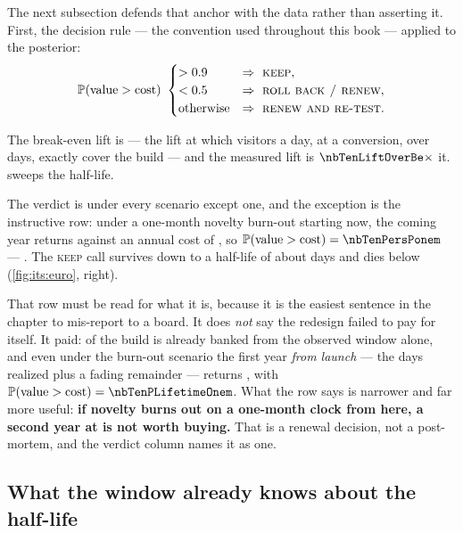 The next subsection defends that anchor with the data rather than asserting it. First, the decision
rule --- the convention used throughout this book --- applied to the posterior:
%
\begin{equation}
  \Prob(\text{value} > \text{cost})\ \begin{cases}
    > 0.9 & \Rightarrow\ \textsc{keep},\\
    < 0.5 & \Rightarrow\ \textsc{roll back / renew},\\
    \text{otherwise} & \Rightarrow\ \textsc{renew and re-test}.
  \end{cases}
  \label{eq:its:rule}
\end{equation}

The break-even lift is \pp{\nbTenBeLift} --- the lift at which \nbTenVisitors{} visitors a day, at
\eur{\nbTenConvValue} a conversion, over \nbTenHorizon{} days, exactly cover the \eur{\nbTenCost}
build --- and the measured lift is $\nbTenLiftOverBe\times$ it.  sweeps
the half-life.




The verdict is \textbf{\nbTenPersVerdictnodecay} under every scenario except one, and the exception
is the instructive row: under a one-month novelty burn-out starting now, the coming year returns
\eur{\nbTenPersValueonem} against an annual cost of \eur{\nbTenCost}, so
$\Prob(\text{value} > \text{cost}) = \nbTenPersPonem$ --- \nbTenPersVerdictonem. The
\textsc{keep} call survives down to a half-life of about \nbTenHalflifeNinety{} days and dies below
\nbTenHalflifeFifty{} (\cref{fig:its:euro}, right).

That row must be read for what it is, because it is the easiest sentence in the chapter to
mis-report to a board. It does \emph{not} say the redesign failed to pay for itself. It paid:
\pc{\nbTenEurRealizedPctCost} of the build is already banked from the observed window alone, and
even under the burn-out scenario the first year \emph{from launch} --- the \nbTenNPost{} days
realized plus a fading remainder --- returns \eur{\nbTenPersLifetimeOnem}, with
$\Prob(\text{value} > \text{cost}) = \nbTenPLifetimeOnem$. What the row says is narrower and far
more useful: \textbf{if novelty burns out on a one-month clock from here, a second year at
\eur{\nbTenCost} is not worth buying.} That is a renewal decision, not a post-mortem, and the
verdict column names it as one.

\subsection*{What the window already knows about the half-life}

